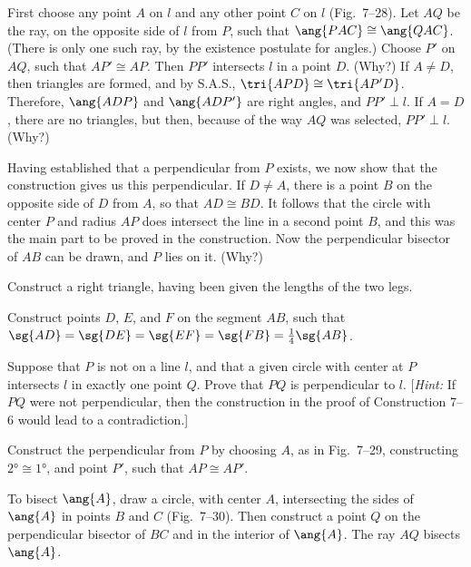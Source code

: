 \documentclass[11pt]{book}
\theoremstyle{bkplain}
\theoremstyle{XIplainnote}
\theoremstyle{bkplain}
\theoremstyle{bkplain}
\begin{document}
First choose any point $A$ on $l$ and any other point $C$ on $l$ (Fig.~7--28).
Let $AQ$ be the ray, on the opposite side of $l$ from $P$, such that
$\ang{PAC} \cong \ang{QAC}$. (There is only one such ray, by the existence
postulate for angles.) Choose $P'$ on $AQ$, such that $AP' \cong AP$. Then
$PP'$ intersects $l$ in a point $D$. (Why?) If $A \neq D$, then triangles are
formed, and by S.A.S., $\tri{APD} \cong \tri{AP'D}$. Therefore, $\ang{ADP}$ and
$\ang{ADP'}$ are right angles, and $PP' \perp l$. If $A = D$, there are no
triangles, but then, because of the way $AQ$ was selected, $PP' \perp l$.
(Why?)

Having established that a perpendicular from $P$ exists, we now show that the
\RC{} construction gives us this perpendicular. If $D \neq A$, there is a point
$B$ on the opposite side of $D$ from $A$, so that $AD \cong BD$. It follows
that the circle with center $P$ and radius $AP$ does intersect the line in a
second point $B$, and this was the main part to be proved in the construction.
Now the perpendicular bisector of $AB$ can be drawn, and $P$ lies on it.
(Why?)

\begin{exercisecols}
\begin{exlist}
\item Construct a right triangle, having been given the lengths of the two
  legs.
\item Construct points $D$, $E$, and $F$ on the segment $AB$, such that
  $\sg{AD} = \sg{DE} = \sg{EF} = \sg{FB} = \frac{1}{4}\sg{AB}$.
\item[\stex 3.] Suppose that $P$ is not on a line $l$, and that a given circle
  with center at $P$ intersects $l$ in exactly one point $Q$. Prove that $PQ$
  is perpendicular to $l$. [\emph{Hint:} If $PQ$ were not perpendicular, then
  the construction in the proof of Construction 7--6 would lead to a
  contradiction.]
\item Construct the perpendicular from $P$ by choosing $A$, as in Fig.~7--29,
  constructing $\ang{2} \cong \ang{1}$, and point $P'$, such that
  $AP \cong AP'$.
\exfig{\FIGVIITWENTYNINE}
\end{exlist}
\end{exercisecols}

\begin{construction}
To bisect $\ang{A}$, draw a circle, with center $A$, intersecting the sides of
$\ang{A}$ in points $B$ and $C$ (Fig.~7--30). Then construct a point $Q$ on the
perpendicular bisector of $BC$ and in the interior of $\ang{A}$. The ray $AQ$
bisects $\ang{A}$.
\end{construction}
\end{document}
